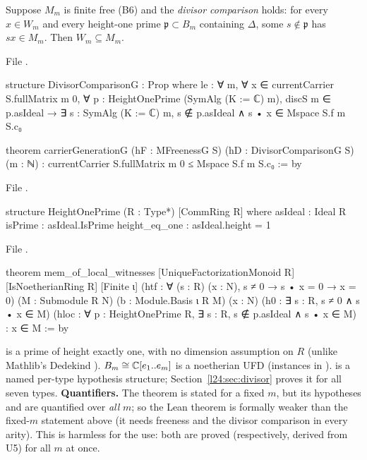 \begin{theorem}[B8: $W_m=M_m$ from freeness and the divisor comparison]\label{l24:thm:B8}
Suppose $M_m$ is finite free (B6) and the \emph{divisor comparison} holds: for every $x\in W_m$ and every height-one
prime $\mathfrak p\subset B_m$ containing $\Delta$, some $s\notin\mathfrak p$ has $sx\in M_m$. Then $W_m\subseteq M_m$.
\end{theorem}
\noindent File .
\begin{leancode}
structure DivisorComparisonG : Prop where
  le : ∀ m, ∀ x ∈ currentCarrier S.fullMatrix m 0, ∀ p : HeightOnePrime (SymAlg (K := ℂ) m),
    discS m ∈ p.asIdeal → ∃ s : SymAlg (K := ℂ) m, s ∉ p.asIdeal ∧ s • x ∈ Mspace S.f m S.c₀

theorem carrierGenerationG (hF : MFreenessG S) (hD : DivisorComparisonG S) (m : ℕ) :
    currentCarrier S.fullMatrix m 0 ≤ Mspace S.f m S.c₀ := by
\end{leancode}
\noindent File .
\begin{leancode}
structure HeightOnePrime (R : Type*) [CommRing R] where
  asIdeal : Ideal R
  isPrime : asIdeal.IsPrime
  height_eq_one : asIdeal.height = 1
\end{leancode}
\noindent File .
\begin{leancode}
theorem mem_of_local_witnesses [UniqueFactorizationMonoid R] [IsNoetherianRing R] [Finite ι]
    (htf : ∀ (s : R) (x : N), s ≠ 0 → s • x = 0 → x = 0)
    (M : Submodule R N) (b : Module.Basis ι R M) (x : N)
    (h0 : ∃ s : R, s ≠ 0 ∧ s • x ∈ M)
    (hloc : ∀ p : HeightOnePrime R, ∃ s : R, s ∉ p.asIdeal ∧ s • x ∈ M) : x ∈ M := by
\end{leancode}

\begin{dictionary}
 is a prime of height exactly one, with no dimension assumption on $R$ (unlike Mathlib's
Dedekind ). $B_m\cong{\mathbb{C}}[e_1..e_m]$ is a noetherian UFD (instances in ).
 is a named per-type hypothesis structure; Section~\ref{l24:sec:divisor} proves it for all
seven types. \textbf{Quantifiers.} The theorem is stated for a fixed $m$, but its hypotheses  and
 are quantified over \emph{all} $m$; so the Lean theorem is formally weaker than the
fixed-$m$ statement above (it needs freeness and the divisor comparison in every arity). This is harmless for the
use: both are proved (respectively, derived from U5) for all $m$ at once.
\end{dictionary}

